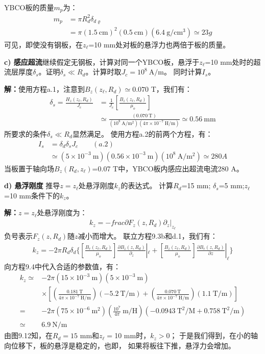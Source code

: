 YBCO板的质量$m_p$为：
\begin{align*}%
m_{p}&=\pi R^{2}_{d}\delta_{d\varrho}\\
&=\pi(1.5\ \mathrm{cm})^{2}(0.5\ \mathrm{cm})(6.4\ \mathrm{g/cm^{3}})\simeq 23g
\end{align*}
可见，即使没有钢板，在$z_\ell$=10 mm处对板的悬浮力也两倍于板的质量。

\textbf{c) 感应超流}\qquad 继续假定无钢板，计算对同一个YBCO板，悬浮于$z_\ell$=10 mm处时的超流层厚度$\delta_s$。证明$\delta_s\ll R_d$。计算时取$J_c=10^8\ \mathrm{A/m}$。
同时计算$I_s$。

\textbf{解：}使用方程a.1，注意到$B_z(z_\ell,R_d)\simeq 0.070$ T，我们有：
\begin{align*}%
\delta_{s}=\frac{H_{z}(z_{\ell},R_{d})}{J_{c}}&=\frac{1}{J_{c}}[\frac{B_{z}(z_{\ell},R_{d})}{\mu_{o}}]\\\tag{a.2}
&\simeq\frac{(0.070\ \mathrm{T})}{(10^{8}\ \mathrm{A/m^{2}})(4\pi\times 10^{-7}\ \mathrm{H/m})}\simeq 0.56\ \mathrm{mm}
\end{align*}
所要求的条件$\delta_s\ll R_d$显然满足。
使用方程a.2的前两个方程，有：
\begin{align*}%
I_{s}&=\delta_{d}\delta_{s}J_{c}\qquad(a.2)\\\tag{a.2}
&\simeq(5\times 10^{-3}\ \mathrm{m})(0.56\times 10^{-3}\ \mathrm{m})(10^{8}\ \mathrm{A/m^{2}})\simeq 280A
\end{align*}
当板置于轴向场$B_z(R_d,z_\ell)$=0.07 T中，YBCO板内感应出超流电流280 A。

\textbf{d) 悬浮刚度}\qquad
推导$z=z_\ell$处悬浮刚度$k_z$的表达式。
计算$R_d$=15 mm; $\delta_s$=5 mm;$z_\ell$=10 mm条件下的$k_z$。

\textbf{解：}$z=z_\ell$处悬浮刚度为：
\begin{align*}%
k_{z}=-frac{\partial F_{z}(z,R_{d})}{\partial_{z}}|_{z_{\ell}}\tag{d.1}
\end{align*}
负号表示$F_{z}(z,R_{d})$随$z$减小而增大。
联立方程9.3b和d.1，我们有：
\begin{align*}%
k_{z}=-2\pi R_{d}\delta_{d}\{[\frac{B_{r}(z_{\ell},R_{d})}{\mu_{o}}]\frac{\partial B_{z}(z,R_{d})}{\partial_{z}}|_{\ell}+[\frac{B_{z}(z_{\ell},R_{d})}{\mu_{o}}]\frac{\partial B_{r}(z,R_{d})}{\partial z}|_{\ell}\}\tag{9.4}
\end{align*}
向方程9.4中代入合适的参数值，有：
\begin{align*}%
k_{z}\simeq&-2\pi(15\times 10^{-3}\ \mathrm{m})(5\times 10^{-3}\ \mathrm{m})\\
&\times[(\frac{0.181\ \mathrm{T}}{4\pi\times 10^{-7}\ \mathrm{H/m}})(-5.2\ \mathrm{T/m})+(\frac{0.070\ \mathrm{T}}{4\pi\times 10^{-7}\ \mathrm{H/m}})(1.1\ \mathrm{T/m})]\\
=&-2\pi(75\times 10^{-6}\ \mathrm{m^{2}})(\frac{10^{7}}{4\pi}\ \mathrm{m/H})(-0.0943\ \mathrm{T^{2}/M}+0.758\ \mathrm{T^{2}/m})\\
\simeq &6.9\ \mathrm{N/m}
\end{align*}
由图9.12知，在$R_d=15$ mm和$z_\ell=$10 mm时，$k_z>0$；
于是我们得到，在小的轴向位移下，板的悬浮是稳定的，也即，
如果将板往下推，悬浮力会增加。

